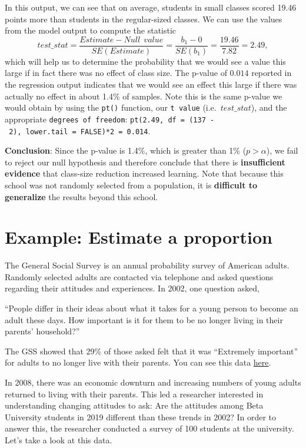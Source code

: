\documentclass[
  letterpaper,
  DIV=11,
  numbers=noendperiod]{scrreprt}
\theoremstyle{definition}
\theoremstyle{remark}
\begin{document}
In this output, we can see that on average, students in small classes
scored 19.46 points more than students in the regular-sized classes. We
can use the values from the model output to compute the statistic
\[test\_stat = \frac{Estimate - Null \ \ value}{SE(Estimate)} = \frac{b_1 - 0}{SE(b_1)} = \frac{19.46}{7.82} = 2.49,\]
which will help us to determine the probability that we would see a
value this large if in fact there was no effect of class size. The
p-value of \(0.014\) reported in the regression output indicates that we
would see an effect this large if there was actually no effect in about
1.4\% of samples. Note this is the same p-value we would obtain by using
the \texttt{pt()} function, our \texttt{t\ value} (i.e.~\(test\_stat\)),
and the appropriate \texttt{degrees\ of\ freedom}:
\texttt{pt(2.49,\ df\ =\ (137\ -\ 2),\ lower.tail\ =\ FALSE)*2\ =\ 0.014}.

\textbf{Conclusion}: Since the p-value is 1.4\%, which is greater than
1\% (\(p > \alpha\)), we fail to reject our null hypothesis and
therefore conclude that there is \textbf{insufficient evidence} that
class-size reduction increased learning. Note that because this school
was not randomly selected from a population, it is \textbf{difficult to
generalize} the results beyond this school.

\hypertarget{example-estimate-a-proportion}{%
\section{Example: Estimate a
proportion}\label{example-estimate-a-proportion}}

The General Social Survey is an annual probability survey of American
adults. Randomly selected adults are contacted via telephone and asked
questions regarding their attitudes and experiences. In 2002, one
question asked,

``People differ in their ideas about what it takes for a young person to
become an adult these days. How important is it for them to be no longer
living in their parents' household?''

The GSS showed that 29\% of those asked felt that it was ``Extremely
important'' for adults to no longer live with their parents. You can see
this data
\href{https://gssdataexplorer.norc.org/variables/2896/vshow}{here}.

In 2008, there was an economic downturn and increasing numbers of young
adults returned to living with their parents. This led a researcher
interested in understanding changing attitudes to ask: Are the attitudes
among Beta University students in 2019 different than these trends in
2002? In order to answer this, the researcher conducted a survey of 100
students at the university. Let's take a look at this data.
\end{document}
